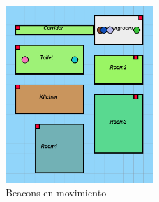 \documentclass[paper=a4, fontsize=11pt,twoside]{scrartcl}
\begin{document}
            \begin{center}
                \begin{figure}[]
                    \centering
                    \includegraphics[width=0.5\textwidth]{../../Memmory/images/house_simulation_3.PNG}
                    \caption{Beacons en movimiento}
                    \label{fig:mesh18}
                \end{figure}
            \end{center}   
\end{document}
